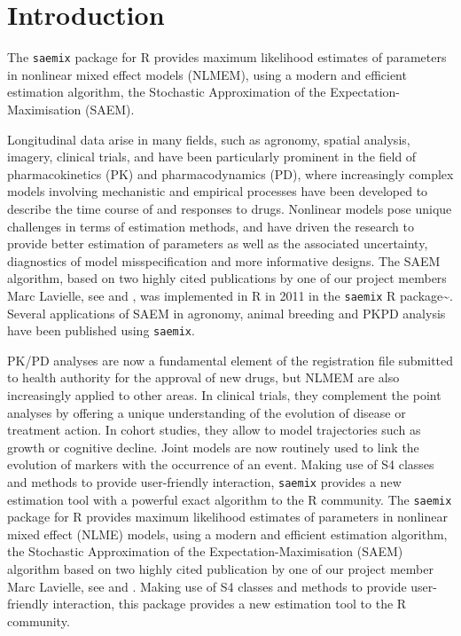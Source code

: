 \documentclass[]{book}
\begin{document}
\chapter{Introduction}\label{intro}

The \texttt{saemix} package for R provides maximum likelihood estimates
of parameters in nonlinear mixed effect models (NLMEM), using a modern
and efficient estimation algorithm, the Stochastic Approximation of the
Expectation-Maximisation (SAEM).

Longitudinal data arise in many fields, such as agronomy, spatial
analysis, imagery, clinical trials, and have been particularly prominent
in the field of pharmacokinetics (PK) and pharmacodynamics (PD), where
increasingly complex models involving mechanistic and empirical
processes have been developed to describe the time course of and
responses to drugs. Nonlinear models pose unique challenges in terms of
estimation methods, and have driven the research to provide better
estimation of parameters as well as the associated uncertainty,
diagnostics of model misspecification and more informative designs. The
SAEM algorithm, based on two highly cited publications by one of our
project members Marc Lavielle, see \citep{lavielle} and \citep{kuhn},
was implemented in R in 2011 in the \texttt{saemix} R
package\textasciitilde{}\citep{saemix2017}. Several applications of SAEM
in agronomy, animal breeding and PKPD analysis have been published using
\texttt{saemix}.

PK/PD analyses are now a fundamental element of the registration file
submitted to health authority for the approval of new drugs, but NLMEM
are also increasingly applied to other areas. In clinical trials, they
complement the point analyses by offering a unique understanding of the
evolution of disease or treatment action. In cohort studies, they allow
to model trajectories such as growth or cognitive decline. Joint models
are now routinely used to link the evolution of markers with the
occurrence of an event. Making use of S4 classes and methods to provide
user-friendly interaction, \texttt{saemix} provides a new estimation
tool with a powerful exact algorithm to the R community. The
\texttt{saemix} package for R provides maximum likelihood estimates of
parameters in nonlinear mixed effect (NLME) models, using a modern and
efficient estimation algorithm, the Stochastic Approximation of the
Expectation-Maximisation (SAEM) algorithm based on two highly cited
publication by one of our project member Marc Lavielle, see
\citep{lavielle} and \citep{kuhn}. Making use of S4 classes and methods
to provide user-friendly interaction, this package provides a new
estimation tool to the R community.
\end{document}
